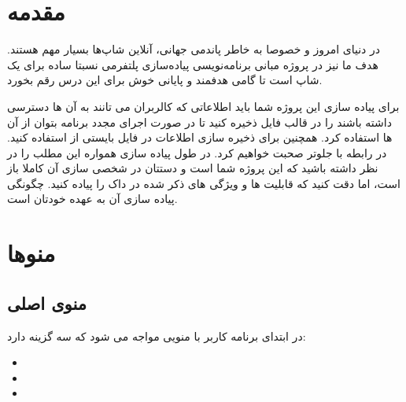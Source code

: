 \documentclass{article}
\begin{document}
    \thispagestyle{empty}
    \tableofcontents
    \newpage
    \clearpage
    \setcounter{page}{1}

    \section{مقدمه}
    در دنیای امروز و خصوصا به خاطر 
    پاندمی جهانی، آنلاین شاپ‌ها بسیار مهم هستند. هدف ما نیز 
    در پروژه مبانی برنامه‌نویسی پیاده‌سازی پلتفرمی نسبتا 
    ساده برای یک شاپ است تا گامی هدفمند و پایانی خوش 
    برای این درس رقم بخورد.

    برای پیاده سازی این پروژه شما باید اطلاعاتی که کالربران 
    می تانند به آن ها دسترسی داشته باشند را در قالب فایل
    ذخیره کنید تا در صورت اجرای مجدد برنامه بتوان از آن ها 
    استفاده کرد. همچنین برای ذخیره سازی اطلاعات در فایل
    بایستی از 
    استفاده کنید. در رابطه با 
    جلوتر صحبت خواهیم کرد.
    در طول پیاده سازی همواره این مطلب را در نظر داشته باشید که این پروژه 
    شما است و دستتان در شخصی سازی آن کاملا باز است، اما دقت کنید که قابلیت ها و 
    ویژگی های ذکر شده در داک را پیاده کنید. چگونگی پیاده سازی آن 
    به عهده خودتان است.

    \section{منوها}
    \subsection{منوی اصلی}
    در ابتدای برنامه کاربر با منویی مواجه می شود که 
    سه گزینه دارد:
    \begin{itemize}[label=\textcolor{celestialblue}{\textbullet}]
        \item {}
        \item {}
        \item {}
    \end{itemize}
\end{document}
